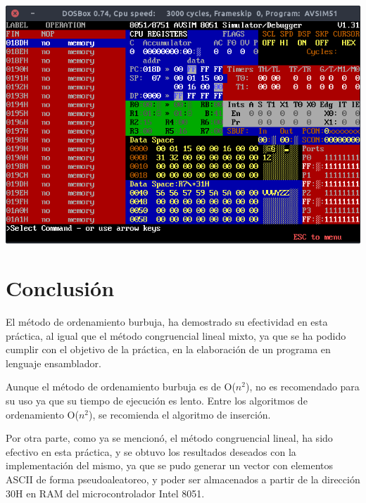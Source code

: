 \documentclass[doc, donotrepeattitle, biblatex, apacite]{apa6}
\begin{document}
\begin{center}
\includegraphics[scale=0.5]{icler11}
\end{center}

\newpage
\section{Conclusión}
El método de ordenamiento burbuja, ha demostrado su efectividad en esta práctica, al igual
que el método congruencial lineal mixto, ya que se ha podido cumplir con el objetivo de la práctica, en
la elaboración de un programa en lenguaje ensamblador.

Aunque el método de ordenamiento burbuja es de O($n^{2}$), no es recomendado para su uso ya
que su tiempo de ejecución es lento. Entre los algoritmos de ordenamiento O($n^{2}$), se recomienda el
algoritmo de inserción.

Por otra parte, como ya se mencionó, el método congruencial lineal, ha sido efectivo en esta
práctica, y se obtuvo los resultados deseados con la implementación del mismo, ya que se pudo generar
un vector con elementos ASCII de forma pseudoaleatoreo, y poder ser almacenados a partir de la
dirección 30H en RAM del microcontrolador Intel 8051.

\newpage
\end{document}
